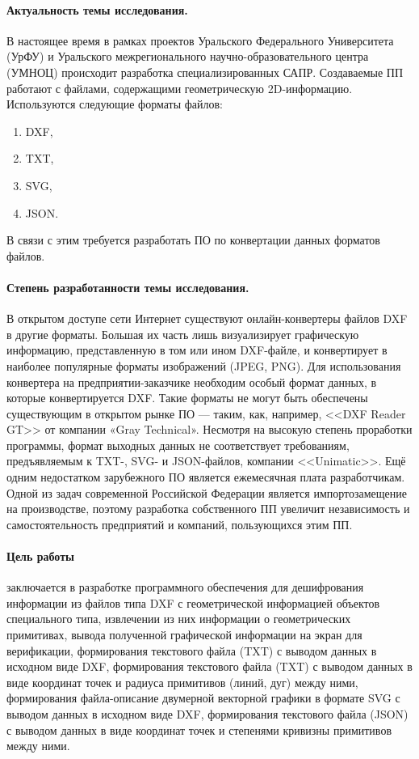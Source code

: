 \Introduction

\paragraph{Актуальность темы исследования.} В настоящее время в рамках проектов Уральского Федерального Университета (УрФУ) и Уральского межрегионального научно-образовательного центра (УМНОЦ) происходит разработка специализированных САПР. Создаваемые ПП работают с файлами, содержащими геометрическую 2D-информацию. Используются следующие форматы файлов:

\begin{enumerate}
	\item DXF,
	\item TXT,
	\item SVG,
	\item JSON.
\end{enumerate}

В связи с этим требуется разработать ПО по конвертации данных форматов файлов.

\paragraph{Степень разработанности темы исследования.} В открытом доступе сети Интернет существуют онлайн-конвертеры файлов DXF в другие форматы. Большая их часть лишь визуализирует графическую информацию, представленную в том или ином DXF-файле, и конвертирует в наиболее популярные форматы изображений (JPEG, PNG). Для использования конвертера на предприятии-заказчике необходим особый формат данных, в которые конвертируется DXF. Такие форматы не могут быть обеспечены существующим в открытом рынке ПО --- таким, как, например, <<DXF Reader GT>> от компании «Gray Technical». Несмотря на высокую степень проработки программы, формат выходных данных не соответствует требованиям, предъявляемым к TXT-, SVG- и JSON-файлов, компании <<Unimatic>>. Ещё одним недостатком зарубежного ПО является ежемесячная плата разработчикам. Одной из задач современной Российской Федерации является импортозамещение на производстве, поэтому разработка собственного ПП увеличит независимость и самостоятельность предприятий и компаний, пользующихся этим ПП.

\paragraph{Цель работы} заключается в разработке программного обеспечения для дешифрования информации из файлов типа DXF с геометрической информацией объектов специального типа, извлечении из них информации о геометрических примитивах, вывода полученной графической информации на экран для верификации, формирования текстового файла (TXT) с выводом данных в исходном виде DXF, формирования текстового файла (TXT) с выводом данных в виде координат точек и радиуса примитивов (линий, дуг) между ними, формирования файла-описание двумерной векторной графики в формате SVG с выводом данных в исходном виде DXF, формирования текстового файла (JSON) с выводом данных в виде координат точек и степенями кривизны примитивов между ними.

